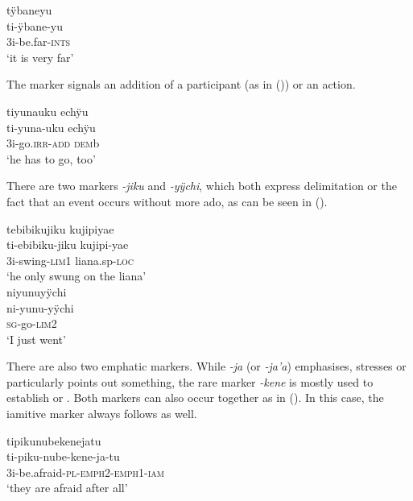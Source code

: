 \ea\label{ex:Sketch-INTS}
\begingl
\glpreamble tÿbaneyu\\
\gla ti-ÿbane-yu\\
\glb 3i-be.far-\textsc{ints}\\
\glft ‘it is very far’\\
\endgl
\xe

The  marker signals an addition of a participant (as in ()) or an action.

\ea\label{ex:Sketch-ADD}
\begingl
\glpreamble tiyunauku echÿu\\
\gla ti-yuna-uku echÿu\\
\glb 3i-go.\textsc{irr}-\textsc{add} \textsc{dem}b\\
\glft ‘he has to go, too’\\
\endgl
\xe

There are two  markers \textit{-jiku} and \textit{-yÿchi}, which both express delimitation or the fact that an event occurs without more ado, as can be seen in ().

\ea\label{ex:Sketch-LIM}
  \ea
\begingl
\glpreamble tebibikujiku kujipiyae\\
\gla ti-ebibiku-jiku kujipi-yae\\
\glb 3i-swing-\textsc{lim}1 liana.sp-\textsc{loc}\\
\glft ‘he only swung on the liana’\\
\endgl
  \ex
\begingl
\glpreamble niyunuyÿchi\\
\gla ni-yunu-yÿchi\\
\textsc{sg}-go-\textsc{lim}2\\
\glft ‘I just went’\\
\endgl
\z
\xe

There are also two emphatic markers. While \textit{-ja} (or \textit{-ja’a}) emphasises, stresses or particularly points out something, the rare marker \textit{-kene} is mostly used to establish   or . Both markers can also occur together as in (). In this case, the iamitive marker always follows as well.

\ea\label{ex:Sketch-EMPH}
\begingl
\glpreamble tipikunubekenejatu\\
\gla ti-piku-nube-kene-ja-tu\\
\glb 3i-be.afraid-\textsc{pl}-\textsc{emph}2-\textsc{emph}1-\textsc{iam}\\
\glft ‘they are afraid after all’\\
\endgl
\xe
{}

